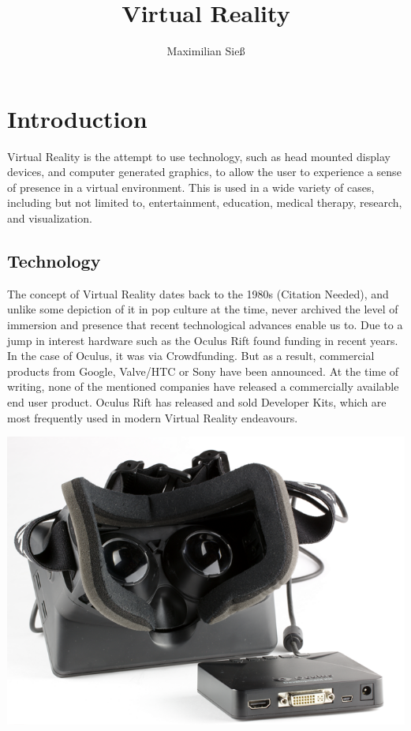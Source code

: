 \documentclass[10pt]{report}
\begin{document}
\title{Virtual Reality}
\author{Maximilian Sieß}
\maketitle

\tableofcontents


\chapter{Introduction}
Virtual Reality is the attempt to use technology, such as head mounted display devices, and computer generated graphics, to allow the user to experience a sense of presence in a virtual environment. This is used in a wide variety of cases, including but not limited to, entertainment, education, medical therapy, research, and visualization.

\section{Technology}
The concept of Virtual Reality dates back to the 1980s (Citation Needed), and unlike some depiction of it in pop culture at the time, never archived the level of immersion and presence that recent technological advances enable us to. Due to a jump in interest hardware such as the Oculus Rift found funding in recent years. In the case of Oculus, it was via Crowdfunding. But as a result, commercial products from Google, Valve/HTC or Sony have been announced. At the time of writing, none of the mentioned companies have released a commercially available end user product. Oculus Rift has released and sold Developer Kits, which are most frequently used in modern Virtual Reality endeavours.

\includegraphics[scale=0.3]{or_small}
	
\end{document}
